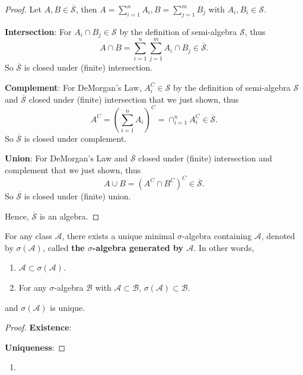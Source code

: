 \begin{proof}
    Let $A,B\in\overline{\mathcal{S}}$, then $A=\sum_{i=1}^{n}A_i, B=\sum_{j=1}^{m}B_j$ with $A_i,B_i\in\mathcal{S}$.\par
    \textbf{Intersection}: For $A_i\cap B_j\in\mathcal{S}$ by the definition of semi-algebra $\mathcal{S}$, thus $$A\cap B=\sum_{i=1}^{n}\sum_{j=1}^{m}A_i\cap B_j\in\overline{\mathcal{S}}.$$ So $\overline{\mathcal{S}}$ is closed under (finite) intersection.\par
    \textbf{Complement}: For DeMorgan's Law, $A_i^C\in\mathcal{S}$ by the definition of semi-algebra $\mathcal{S}$ and $\overline{\mathcal{S}}$ closed under (finite) intersection that we just shown, thus $$A^C=(\sum_{i=1}^{n}A_i)^C=\cap_{i=1}^{n}A_i^C\in\overline{\mathcal{S}}.$$ So $\overline{\mathcal{S}}$ is closed under complement.\par
    \textbf{Union}: For DeMorgan's Law and $\overline{\mathcal{S}}$ closed under (finite) intersection and complement that we just shown, thus $$A\cup B=(A^C\cap B^C)^C\in\overline{\mathcal{S}}.$$ So $\overline{\mathcal{S}}$ is closed under (finite) union.\par
    Hence, $\overline{\mathcal{S}}$ is an algebra.
\end{proof}

\begin{theorem}
    For any class $\mathcal{A}$, there exists a unique minimal $\sigma$-algebra containing $\mathcal{A}$, denoted by $\sigma(\mathcal{A})$, called \textbf{the $\sigma$-algebra generated by $\mathcal{A}$}. In other words,
    \begin{enumerate}
        \item $\mathcal{A}\subset\sigma(\mathcal{A})$.
        \item For any $\sigma$-algebra $\mathcal{B}$ with $\mathcal{A}\subset\mathcal{B}$, $\sigma(\mathcal{A})\subset\mathcal{B}$.
    \end{enumerate}
    and $\sigma(\mathcal{A})$ is unique.
\end{theorem}

\begin{proof}
    \textbf{Existence}:\par
    \textbf{Uniqueness}:\par
\end{proof}

\begin{example}
    \begin{enumerate}
        \item
    \end{enumerate}
\end{example}

